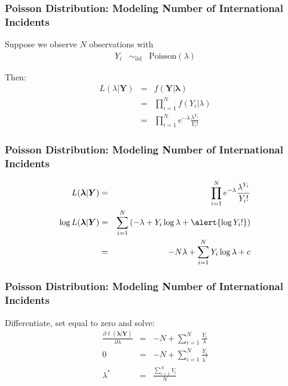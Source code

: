 \documentclass{beamer}
\begin{document}
\begin{frame}
\frametitle{Poisson Distribution: Modeling Number of International Incidents}

Suppose we observe $N$ observations with
\begin{eqnarray}
Y_{i} & \sim_{\text{iid}} & \text{Poisson}(\lambda)\nonumber
\end{eqnarray}

Then:
\begin{eqnarray}
L(\lambda| \boldsymbol{Y}) & = & f(\boldsymbol{Y}| \boldsymbol{\lambda} ) \nonumber \\
                           & = & \prod_{i=1}^{N} f(Y_{i}|\lambda) \nonumber \\
                          &  = & \prod_{i=1}^{N} e^{-\lambda} \frac{\lambda^{Y_{i}}}{Y_{i}!}\nonumber
\end{eqnarray}




\end{frame}

\begin{frame}
\frametitle{Poisson Distribution: Modeling Number of International Incidents}

\begin{eqnarray}
L(\boldsymbol{\lambda} | \boldsymbol{Y} ) & = & \prod_{i=1}^{N} e^{-\lambda} \frac{\lambda^{Y_{i}} } { Y_{i}!} \nonumber \\
\log L(\boldsymbol{\lambda} | \boldsymbol{Y} )  & = & \sum_{i=1}^{N} \left(-\lambda + Y_{i} \log \lambda + \alert{\log Y_{i}!}\right) \nonumber \\
& = & -N \lambda + \sum_{i=1}^{N} Y_{i} \log \lambda + c\nonumber
\end{eqnarray}

\end{frame}

\begin{frame}
\frametitle{Poisson Distribution: Modeling Number of International Incidents}

Differentiate, set equal to zero and solve:
\begin{eqnarray}
\frac{\partial \ell(\boldsymbol{\lambda}| \boldsymbol{Y})}{\partial \lambda } & = & - N + \sum_{i=1}^{N} \frac{Y_{i} }{\lambda} \nonumber \\
0 & = & - N + \sum_{i=1}^{N} \frac{Y_{i} }{\lambda^{*}} \nonumber \\
\lambda^{*} & = & \frac{\sum_{i=1}^{N} Y_{i} }{N} \nonumber
\end{eqnarray}


\end{frame}
\end{document}

